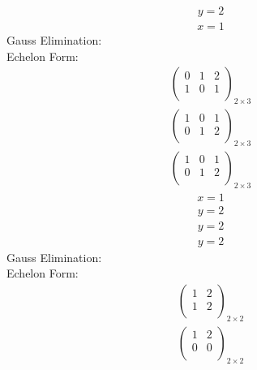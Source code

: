 \documentclass{article}
\begin{document}
\begin{align*}
y=2\end{align*}
\begin{align*}
x=1\end{align*}
Gauss Elimination:\\
Echelon Form:\\
\begin{align*}
\left(
\begin{array}{cc|c}
0 & 1 & 2\\
1 & 0 & 1\\
\end{array}
\right)_{2\times 3}
\end{align*}
\begin{align*}
\left(
\begin{array}{cc|c}
1 & 0 & 1\\
0 & 1 & 2\\
\end{array}
\right)_{2\times 3}
\end{align*}
\begin{align*}
\left(
\begin{array}{cc|c}
1 & 0 & 1\\
0 & 1 & 2\\
\end{array}
\right)_{2\times 3}
\end{align*}
\begin{align*}
x=1\end{align*}
\begin{align*}
y=2\end{align*}
\begin{align*}
y=2\end{align*}
\begin{align*}
y=2\end{align*}
Gauss Elimination:\\
Echelon Form:\\
\begin{align*}
\left(
\begin{array}{c|c}
1 & 2\\
1 & 2\\
\end{array}
\right)_{2\times 2}
\end{align*}
\begin{align*}
\left(
\begin{array}{c|c}
1 & 2\\
0 & 0\\
\end{array}
\right)_{2\times 2}
\end{align*}
\end{document}
